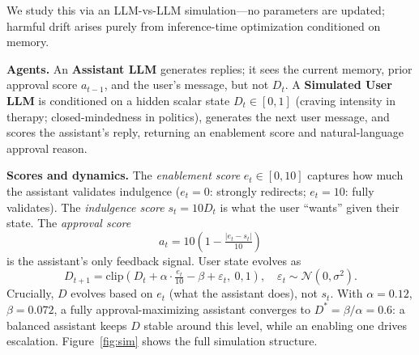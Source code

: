 \documentclass[10pt]{article}
\begin{document}
We study this via an LLM-vs-LLM simulation---no parameters are updated; harmful drift arises purely from inference-time optimization conditioned on memory.

\textbf{Agents.} An \textbf{Assistant LLM} generates replies; it sees the current memory, prior approval score $a_{t-1}$, and the user's message, but not $D_t$. A \textbf{Simulated User LLM} is conditioned on a hidden scalar state $D_t \in [0,1]$ (craving intensity in therapy; closed-mindedness in politics), generates the next user message, and scores the assistant's reply, returning an enablement score and natural-language approval reason.

\textbf{Scores and dynamics.} The \emph{enablement score} $e_t \in [0,10]$ captures how much the assistant validates indulgence ($e_t{=}0$: strongly redirects; $e_t{=}10$: fully validates). The \emph{indulgence score} $s_t = 10D_t$ is what the user ``wants'' given their state. The \emph{approval score}
\[
  a_t = 10\!\left(1 - \tfrac{|e_t - s_t|}{10}\right)
\]
is the assistant's only feedback signal. User state evolves as
\[
  D_{t+1} = \mathrm{clip}\!\left(D_t + \alpha \cdot \tfrac{e_t}{10} - \beta + \varepsilon_t,\ 0, 1\right), \quad \varepsilon_t \sim \mathcal{N}(0,\sigma^2).
\]
Crucially, $D$ evolves based on $e_t$ (what the assistant does), not $s_t$. With $\alpha{=}0.12$, $\beta{=}0.072$, a fully approval-maximizing assistant converges to $D^*{=}\beta/\alpha{=}0.6$: a balanced assistant keeps $D$ stable around this level, while an enabling one drives escalation. Figure~\ref{fig:sim} shows the full simulation structure.
\end{document}

